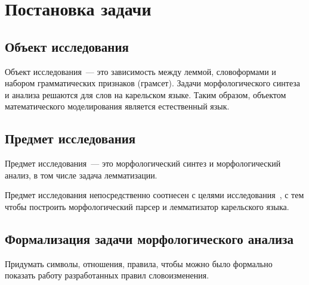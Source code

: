 \chapter{Постановка задачи} \label{chapt_problem_formulation}

\section{Объект исследования} \label{sect_problem_obj}

Объект исследования~--- это зависимость между леммой, словоформами 
и набором грамматических признаков (грамсет).
Задачи морфологического синтеза и анализа решаются для слов на карельском языке.
Таким образом, объектом математического моделирования 
является естественный язык. 


\section{Предмет исследования} \label{sect_predmet_obj}

Предмет исследования~--- это морфологический синтез и морфологический анализ, 
в том числе задача лемматизации. 

Предмет исследования непосредственно соотнесен 
с целями исследования~\cite{Martishina2001Object}, 
с тем чтобы построить морфологический парсер и лемматизатор карельского языка. 

\section{Формализация задачи морфологического анализа} \label{sect_formal}

Придумать символы, отношения, правила, чтобы можно было формально показать работу 
разработанных правил словоизменения.

 

